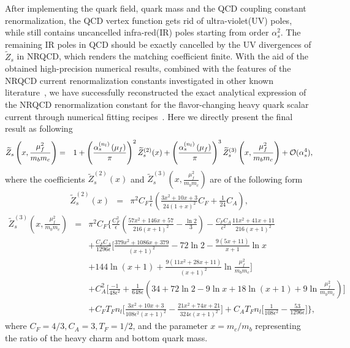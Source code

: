 \documentclass[onecolumn,preprintnumbers,aps,superscriptaddress,nofootinbib,prd,notitlepage]{revtex4-1}
\newcommand{\beq}{\begin{eqnarray}}
\newcommand{\eeq}{\end{eqnarray}}
\newcommand{\non}{\nonumber\\ }
\begin{document}
After implementing the quark field, quark mass and  the QCD coupling constant renormalization,  the QCD vertex function  gets rid of ultra-violet(UV) poles, while still contains  uncancelled infra-red(IR) poles starting from order $\alpha_s^2$.  The remaining IR poles in QCD should be exactly  cancelled by the UV divergences of ${\widetilde Z}_s$ in NRQCD, which  renders the matching coefficient finite.  With the aid of the obtained high-precision numerical results, combined with the features of the NRQCD  current renormalization constants investigated in other known literature~\cite{Feng:2022vvk,Feng:2022ruy,Sang:2022tnh,Egner:2022jot},  we have successfully reconstructed the exact analytical expression of the NRQCD  renormalization constant for the flavor-changing heavy quark scalar current through numerical fitting recipes~\cite{ferguson1999analysis,abramowitz1964handbook,Duhr:2019tlz}. Here we directly present the final result  as following
\beq
\widetilde{Z}_s\left(x, {\mu^2_f\over m_b m_c } \right) &=& 1+\left(\frac{\alpha_{s}^{\left(n_{l}\right)}\left(\mu_f\right)}{\pi}\right)^{2} \widetilde{Z}_s^{(2)}(x)
+\left(\frac{\alpha_{s}^{\left(n_{l}\right)}\left(\mu_f\right)}{\pi}\right)^{3} \widetilde{Z}_s^{(3)}\left(x,\frac{\mu^2_f}{m_bm_c} \right)  +\mathcal{O}(\alpha_s^4),  \label{eq:Zs01}
\eeq
where the coefficients $ \widetilde{Z}_s^{(2)}(x)$ and $\widetilde{Z}_s^{(3)}\left(x,\frac{\mu^2_f}{m_bm_c} \right)$ are of the following form
\beq
 \widetilde{Z}_s^{(2)}(x) &=& \pi^{2}C_{F}  \frac{1}{\epsilon}\left(\frac{3x^2+10x+3}{24\left(1+x\right)^2}C_{F}+\frac{1}{24}C_{A}\right), \label{eq:f2epx}
\eeq
\beq
\widetilde{Z}_s^{(3)}\left(x,\frac{\mu^2_f}{m_bm_c} \right) &=& \pi^{2}C_{F} \Bigg\{ \frac{C_F^2}{\epsilon}\left (\frac{57x^2+146x+57}{216(x+1)^2}-\frac{\ln2}{3}\right)  -  \frac{C_F C_A}{\epsilon^2} \frac{11 x^2+41 x+11}{216 (x+1)^2 } \non
&& + \frac{C_FC_A}{1296 \epsilon }\bigg[ \frac{379 x^2+1086 x+379}{(x+1)^2}-72 \ln2-\frac{9 (5 x+11) }{x+1}\ln x \non
&&  +144 \ln (x+1)+\frac{9 \left(11 x^2+28 x+11\right) }{(x+1)^2}\ln \frac{\mu _f^2}{m_b	m_c} \bigg] \non
&& + C_A^2  \Bigg[\frac{-1}{48 \epsilon ^2}+\frac{1}{648 \epsilon}\left(34+72 \ln2-9 \ln x+18 \ln (x+1)+9 \ln \frac{\mu _f^2}{m_b m_c} \right)\Bigg] \non
&& + C_F T_F n_l\bigg[\frac{3 x^2+10	x+3}{108\epsilon ^2 (x+1)^2 }-\frac{21 x^2+74 x+21}{324 \epsilon (x+1)^2 }\bigg] +C_A  T_F n_l \bigg[\frac{1}{108 \epsilon ^2}-\frac{53}{1296 \epsilon }\bigg]\Bigg\} ,  \label{eq:f3epx}
\eeq
where $C_F=4/3,C_A=3,T_F=1/2$, and the parameter  $x =m_c/m_b$ representing the ratio of the heavy charm and bottom quark mass.
\end{document}
